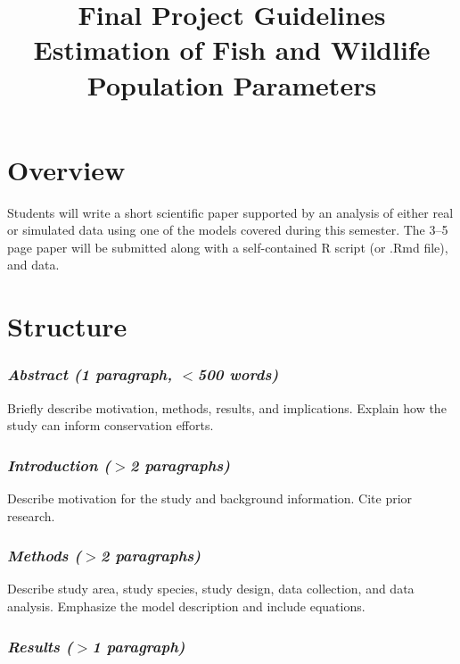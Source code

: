 \documentclass[12pt]{article}
\title{Final Project Guidelines \\ Estimation of Fish and Wildlife Population Parameters}%
\date{}
\begin{document}
\vspace{-72pt}

\maketitle

\vspace{-72pt}

\section*{Overview}

Students will write a short scientific paper supported by an analysis 
of either real or simulated data using one of the models covered
during this semester. The 3--5 page paper will be submitted along with
a self-contained R script (or .Rmd file), and data.


\section*{Structure}

\subsubsection*{\it Abstract \normalfont (1 paragraph, $<$500 words)}

Briefly describe motivation, methods, results, and
implications. Explain how the study can inform conservation efforts.

\subsubsection*{\it Introduction \normalfont ($>$2 paragraphs)}

Describe motivation for the study and background
information. Cite prior research.

\subsubsection*{\it Methods \normalfont ($>$2 paragraphs)}

Describe study area, study species, study design, data collection, and
data analysis. Emphasize the model description and include equations.

\subsubsection*{\it Results \normalfont ($>$1 paragraph)}
\end{document}
